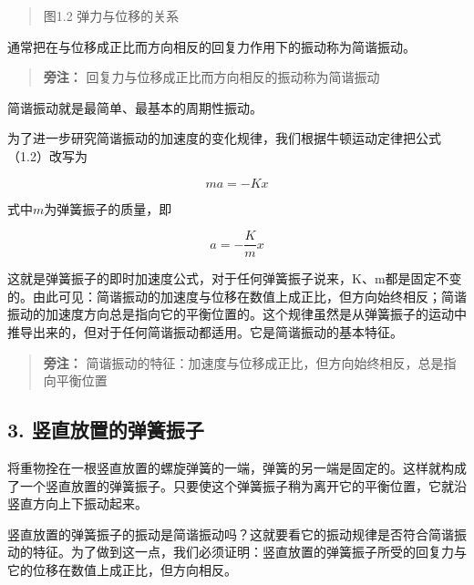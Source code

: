 \begin{quote}
图1.2 弹力与位移的关系
\end{quote}

通常把在与位移成正比而方向相反的回复力作用下的振动称为简谐振动。

\begin{quote}
\textbf{旁注：} 回复力与位移成正比而方向相反的振动称为简谐振动
\end{quote}

简谐振动就是最简单、最基本的周期性振动。

为了进一步研究简谐振动的加速度的变化规律，我们根据牛顿运动定律把公式（1.2）改写为

\[
m a = - K x
\]

式中\(m\)为弹簧振子的质量，即

\[
a = - \frac {K}{m} x \tag {1.3}
\]

这就是弹簧振子的即时加速度公式，对于任何弹簧振子说来，K、m都是固定不变的。由此可见：简谐振动的加速度与位移在数值上成正比，但方向始终相反；简谐振动的加速度方向总是指向它的平衡位置的。这个规律虽然是从弹簧振子的运动中推导出来的，但对于任何简谐振动都适用。它是简谐振动的基本特征。

\begin{quote}
\textbf{旁注：}
简谐振动的特征：加速度与位移成正比，但方向始终相反，总是指向平衡位置
\end{quote}

\subsection{3.
竖直放置的弹簧振子}\label{ux7ad6ux76f4ux653eux7f6eux7684ux5f39ux7c27ux632fux5b50}

将重物拴在一根竖直放置的螺旋弹簧的一端，弹簧的另一端是固定的。这样就构成了一个竖直放置的弹簧振子。只要使这个弹簧振子稍为离开它的平衡位置，它就沿竖直方向上下振动起来。

竖直放置的弹簧振子的振动是简谐振动吗？这就要看它的振动规律是否符合简谐振动的特征。为了做到这一点，我们必须证明：竖直放置的弹簧振子所受的回复力与它的位移在数值上成正比，但方向相反。

